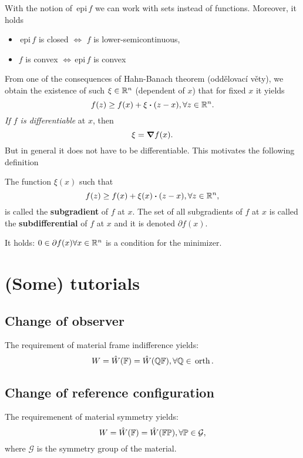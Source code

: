 \documentclass[reqno, a4paper]{article}
\begin{document}
\begin{remark}
    With the notion of $\, \text{epi} \,f$ we can work with sets instead of functions. Moreover, it holds
    \begin{itemize}
	    \item $\, \text{epi} \,f$ is closed $\Leftrightarrow$ $f$ is lower-semicontinuous,
	    \item $f$ is convex $\Leftrightarrow\, \text{epi} \,f$ is convex
    \end{itemize}
\end{remark}
From one of the consequences of Hahn-Banach theorem (oddělovací věty), we obtain the existence of such $\xi \in {\mathbb R}^n$ (dependent of $x$) that for fixed $x$ it yields
\[
	f(z) \geq f(x) + \xi \vdot (z-x), \forall z \in \R^n.
\]
\textit{If $f$ is differentiable} at $x$, then
\[
	\xi = \grad f(x).
\]
But in general it does not have to be differentiable. This motivates the following definition

\begin{definition}
	The function $\xi(x)$ such that
	\[
		f(z) \geq f(x) + \xi(x) \vdot (z-x), \forall z \in \R^n,
	\]
	is called the \textbf{subgradient} of $f$ at $x$.
	The set of all subgradients of $f$ at $x$ is called the \textbf{subdifferential} of $f$ at $x$ and it is denoted $\partial f (x).$
\end{definition}

\begin{remark}
It holds: $0 \in \partial f(x) \forall x \in {\mathbb R}^n$ is a condition for the minimizer.
\end{remark}

\section{(Some) tutorials}
\label{sec:tutorials}


\subsection{Change of observer}
\label{sec:chobserver}

The requirement of material frame indifference yields:
\[
	W = \hat{W}\qty(\mathbb{F}) = \hat{W}\qty(\mathbb{Q}\mathbb{F}), \forall \mathbb{Q} \in \, \text{orth} \,.
\]

\subsection{Change of reference configuration}
\label{sec:chreference}
The requiremenent of material symmetry yields:
\[
	W= \hat{W}\qty(\mathbb{F})= \hat{W}\qty(\mathbb{F} \mathbb{P}), \forall \mathbb{P} \in \mathcal{G},
\]
where $\mathcal{G}$ is the symmetry group of the material.
\end{document}

